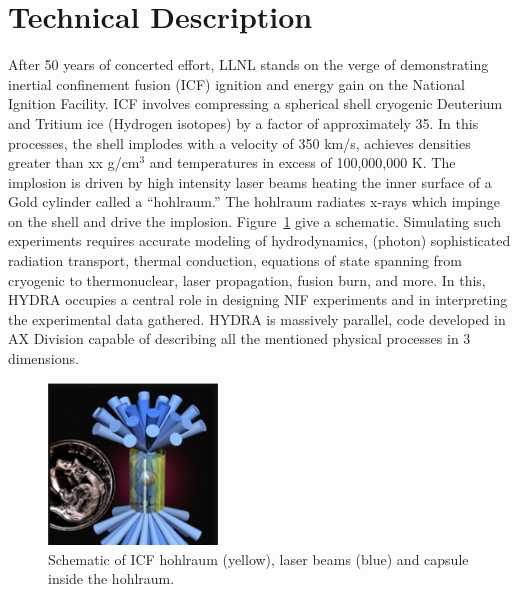 \documentclass[letterpaper,11pt]{article}
\begin{document}

\section*{Technical Description}

After 50 years of concerted effort, LLNL stands on the verge of demonstrating inertial 
confinement fusion (ICF) ignition and energy gain on the National Ignition Facility\@.
ICF involves compressing a spherical shell cryogenic Deuterium and Tritium ice (Hydrogen isotopes) by a factor of approximately 35.  In this processes, the shell implodes with a 
velocity of 350 km/s, achieves densities greater than
xx g/cm${}^3$ and temperatures in
excess of 100,000,000 K.  The implosion is driven by high intensity laser beams heating 
the inner surface of a Gold cylinder called a ``hohlraum.''  The hohlraum radiates x-rays 
which impinge on the shell and drive the implosion.  Figure~\ref{hohlraum} give a schematic.  Simulating such experiments requires accurate modeling of
hydrodynamics, (photon) sophisticated radiation transport, thermal conduction, equations 
of state spanning from cryogenic to thermonuclear, laser propagation, fusion burn, and more.
In this, HYDRA occupies a central role in designing NIF experiments and in interpreting the experimental data gathered.  HYDRA is massively parallel, code developed in AX Division
capable of describing all the mentioned physical processes in 3 dimensions.

\begin{figure}
	\vspace{-25pt}
	\begin{center}
		\includegraphics[width=0.40\textwidth]{hohlraum.jpg}
	\end{center}
	\caption{Schematic of ICF hohlraum (yellow), laser beams (blue) and capsule inside the hohlraum.}
	\label{hohlraum}
\end{figure}
\end{document}
